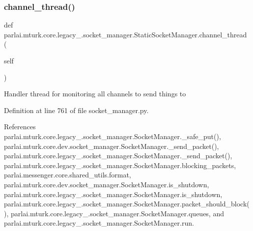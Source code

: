 \subsubsection{\texorpdfstring{channel\+\_\+thread()}{channel\_thread()}}
{\footnotesize\ttfamily def parlai.\+mturk.\+core.\+legacy\+\_.\+socket\+\_\+manager.\+Static\+Socket\+Manager.\+channel\+\_\+thread (\begin{DoxyParamCaption}\item[{}]{self }\end{DoxyParamCaption})}

\begin{DoxyVerb}Handler thread for monitoring all channels to send things to\end{DoxyVerb}
 

Definition at line 761 of file socket\+\_\+manager.\+py.



References parlai.\+mturk.\+core.\+legacy\+\_.\+socket\+\_\+manager.\+Socket\+Manager.\+\_\+safe\+\_\+put(), parlai.\+mturk.\+core.\+dev.\+socket\+\_\+manager.\+Socket\+Manager.\+\_\+send\+\_\+packet(), parlai.\+mturk.\+core.\+legacy\+\_.\+socket\+\_\+manager.\+Socket\+Manager.\+\_\+send\+\_\+packet(), parlai.\+mturk.\+core.\+legacy\+\_.\+socket\+\_\+manager.\+Socket\+Manager.\+blocking\+\_\+packets, parlai.\+messenger.\+core.\+shared\+\_\+utils.\+format, parlai.\+mturk.\+core.\+dev.\+socket\+\_\+manager.\+Socket\+Manager.\+is\+\_\+shutdown, parlai.\+mturk.\+core.\+legacy\+\_.\+socket\+\_\+manager.\+Socket\+Manager.\+is\+\_\+shutdown, parlai.\+mturk.\+core.\+legacy\+\_.\+socket\+\_\+manager.\+Socket\+Manager.\+packet\+\_\+should\+\_\+block(), parlai.\+mturk.\+core.\+legacy\+\_.\+socket\+\_\+manager.\+Socket\+Manager.\+queues, and parlai.\+mturk.\+core.\+legacy\+\_.\+socket\+\_\+manager.\+Socket\+Manager.\+run.

